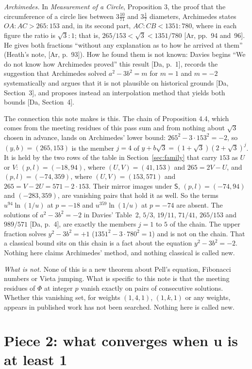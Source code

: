 \documentclass[11pt]{article}
\begin{document}
\medskip
\noindent\emph{Archimedes.} In \emph{Measurement of a Circle}, Proposition 3, the proof that the circumference of a circle lies between $3\frac{10}{71}$ and $3\frac17$ diameters, Archimedes states $OA:AC>265:153$ and, in its second part, $AC:CB<1351:780$, where in each figure the ratio is $\sqrt3:1$; that is, $265/153<\sqrt3<1351/780$ [Ar, pp.~94 and~96]. He gives both fractions ``without any explanation as to how he arrived at them'' (Heath's note, [Ar, p.~93]). How he found them is not known: Davies begins ``We do not know how Archimedes proved'' this result [Da, p.~1], records the suggestion that Archimedes solved $a^2-3b^2=m$ for $m=1$ and $m=-2$ systematically and argues that it is not plausible on historical grounds [Da, Section~3], and proposes instead an interpolation method that yields both bounds [Da, Section~4].

The connection this note makes is this. The chain of Proposition 4.4, which comes from the meeting residues of this pass sum and from nothing about $\sqrt3$ chosen in advance, lands on Archimedes' lower bound: $265^2-3\cdot153^2=-2$, so $(y,b)=(265,153)$ is the member $j=4$ of $y+b\sqrt3=(1+\sqrt3)(2+\sqrt3)^j$. It is held by the two rows of the table in Section~\ref{sec:family} that carry $153$ as $U$ or $V$: $(p,l)=(-18,94)$, where $(U,V)=(41,153)$ and $265=2V-U$, and $(p,l)=(-74,359)$, where $(U,V)=(153,571)$ and $265=V-2U=571-2\cdot153$. Their mirror images under $\mathsf{S}$, $(p,l)=(-74,94)$ and $(-283,359)$, are vanishing pairs that hold it as well. So the terms $u^{94}\ln(1/u)$ at $p=-18$ and $u^{359}\ln(1/u)$ at $p=-74$ are absent. The solutions of $a^2-3b^2=-2$ in Davies' Table~2, $5/3$, $19/11$, $71/41$, $265/153$ and $989/571$ [Da, p.~4], are exactly the members $j=1$ to $5$ of the chain. The upper fraction solves $y^2-3b^2=+1$ ($1351^2-3\cdot780^2=1$) and is not on the chain. That a classical bound sits on this chain is a fact about the equation $y^2-3b^2=-2$. Nothing here claims Archimedes' method, and nothing classical is called new.

\medskip
\noindent\emph{What is not.} None of this is a new theorem about Pell's equation, Fibonacci numbers or Vieta jumping. What is specific to this note is that the meeting residues of $\Phi$ at integer $p$ vanish exactly on pairs of consecutive solutions. Whether this vanishing set, for weights $(1,4,1)$, $(1,k,1)$ or any weights, appears in published work has not been searched. Nothing here is called new.

\section{Piece 2: what converges when u is at least 1}\label{sec:P2}
\end{document}
